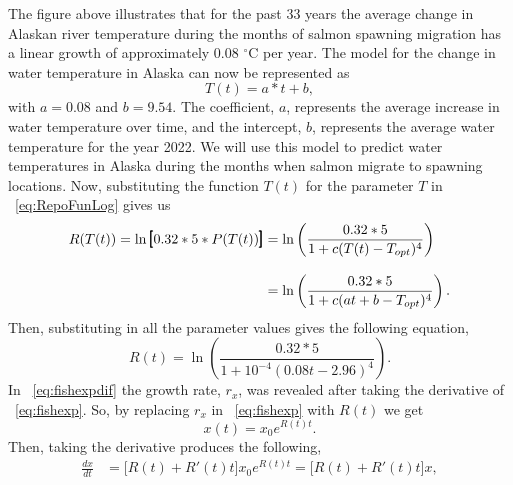 The figure above illustrates that for the past 33 years the average change in Alaskan river temperature during the months of salmon spawning migration has a linear growth of approximately 0.08 $^\circ$C per year.
The model for the change in water temperature in Alaska can now be represented as
\begin{equation}\label{eq:sstmodel}
    T(t) = a*t + b,
\end{equation}
with $a=0.08$ and $b = 9.54$. 
The coefficient, $a$, represents the average increase in water temperature over time, and the intercept, $b$, represents 
the average water temperature for the year 2022.
We will use this model to predict water temperatures in Alaska during the months when salmon migrate to spawning locations.
Now, substituting the function $T(t)$ for the parameter $T$ in \equationautorefname~\eqref{eq:RepoFunLog} gives us
\begin{equation}\label{eq:SalmonRepo}
    \begin{aligned}
        R(T(t)) =\ln\scalebox{1.2}{$\pmb[$}0.32*5*P(T(t))\scalebox{1.2}{$\pmb]$}&= \ln\left(\frac{0.32*5}{1+c(T(t)-T_{opt})^4}\right)\\[.3cm]
        &= \ln\left(\frac{0.32*5}{1+c(at+b-T_{opt})^4}\right).
    \end{aligned}
\end{equation}
Then, substituting in all the parameter values gives the following equation,
\begin{equation}\label{eq:SalmonGrowthTime}
    R(t) = \ln\left(\frac{0.32*5}{1+10^{-4}(0.08t-2.96)^4}\right).
\end{equation}
In \equationautorefname~\eqref{eq:fishexpdif} the growth rate, $r_x$, was revealed after taking the derivative of \equationautorefname~\eqref{eq:fishexp}.
So, by replacing $r_x$ in \equationautorefname~\eqref{eq:fishexp} with $R(t)$ we get
\begin{equation*}
    x(t) = x_0e^{R(t)t}.
\end{equation*}
Then, taking the derivative produces the following,
\begin{equation*}
    \begin{aligned}
        \frac{dx}{dt} &= \pmb[ R(t)+R'(t)t \pmb]x_0e^{R(t)t} = \pmb[ R(t)+R'(t)t \pmb]x,
    \end{aligned}
\end{equation*}
